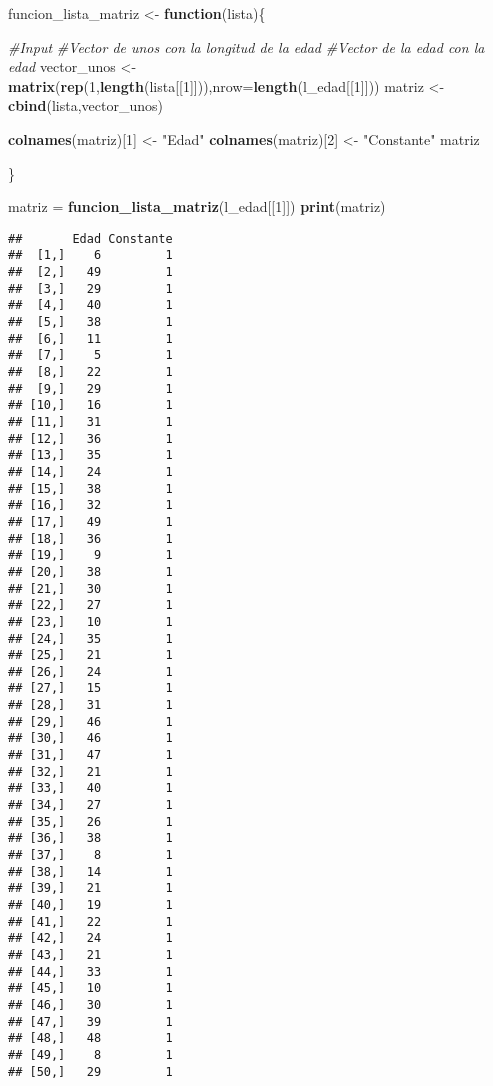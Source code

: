 \documentclass[
]{article}
\newenvironment{Shaded}{\begin{snugshade}}{\end{snugshade}}
\newcommand{\AttributeTok}[1]{\textcolor[rgb]{0.13,0.29,0.53}{#1}}
\newcommand{\CommentTok}[1]{\textcolor[rgb]{0.56,0.35,0.01}{\textit{#1}}}
\newcommand{\ControlFlowTok}[1]{\textcolor[rgb]{0.13,0.29,0.53}{\textbf{#1}}}
\newcommand{\DecValTok}[1]{\textcolor[rgb]{0.00,0.00,0.81}{#1}}
\newcommand{\FunctionTok}[1]{\textcolor[rgb]{0.13,0.29,0.53}{\textbf{#1}}}
\newcommand{\NormalTok}[1]{#1}
\newcommand{\OtherTok}[1]{\textcolor[rgb]{0.56,0.35,0.01}{#1}}
\newcommand{\StringTok}[1]{\textcolor[rgb]{0.31,0.60,0.02}{#1}}
\begin{document}
\begin{Shaded}
\begin{Highlighting}[]
\NormalTok{  funcion\_lista\_matriz }\OtherTok{\textless{}{-}} \ControlFlowTok{function}\NormalTok{(lista)\{}
    
    \CommentTok{\#Input}
      \CommentTok{\#Vector de unos con la longitud de la edad}
      \CommentTok{\#Vector de la edad con la edad    }
\NormalTok{    vector\_unos }\OtherTok{\textless{}{-}} \FunctionTok{matrix}\NormalTok{(}\FunctionTok{rep}\NormalTok{(}\DecValTok{1}\NormalTok{,}\FunctionTok{length}\NormalTok{(lista[[}\DecValTok{1}\NormalTok{]])),}\AttributeTok{nrow=}\FunctionTok{length}\NormalTok{(l\_edad[[}\DecValTok{1}\NormalTok{]]))}
\NormalTok{    matriz }\OtherTok{\textless{}{-}} \FunctionTok{cbind}\NormalTok{(lista,vector\_unos)}
    
    \FunctionTok{colnames}\NormalTok{(matriz)[}\DecValTok{1}\NormalTok{] }\OtherTok{\textless{}{-}} \StringTok{"Edad"}
    \FunctionTok{colnames}\NormalTok{(matriz)[}\DecValTok{2}\NormalTok{] }\OtherTok{\textless{}{-}} \StringTok{"Constante"}
\NormalTok{    matriz}
    
\NormalTok{  \}}

\NormalTok{matriz }\OtherTok{=} \FunctionTok{funcion\_lista\_matriz}\NormalTok{(l\_edad[[}\DecValTok{1}\NormalTok{]])}
\FunctionTok{print}\NormalTok{(matriz)}
\end{Highlighting}
\end{Shaded}

\begin{verbatim}
##       Edad Constante
##  [1,]    6         1
##  [2,]   49         1
##  [3,]   29         1
##  [4,]   40         1
##  [5,]   38         1
##  [6,]   11         1
##  [7,]    5         1
##  [8,]   22         1
##  [9,]   29         1
## [10,]   16         1
## [11,]   31         1
## [12,]   36         1
## [13,]   35         1
## [14,]   24         1
## [15,]   38         1
## [16,]   32         1
## [17,]   49         1
## [18,]   36         1
## [19,]    9         1
## [20,]   38         1
## [21,]   30         1
## [22,]   27         1
## [23,]   10         1
## [24,]   35         1
## [25,]   21         1
## [26,]   24         1
## [27,]   15         1
## [28,]   31         1
## [29,]   46         1
## [30,]   46         1
## [31,]   47         1
## [32,]   21         1
## [33,]   40         1
## [34,]   27         1
## [35,]   26         1
## [36,]   38         1
## [37,]    8         1
## [38,]   14         1
## [39,]   21         1
## [40,]   19         1
## [41,]   22         1
## [42,]   24         1
## [43,]   21         1
## [44,]   33         1
## [45,]   10         1
## [46,]   30         1
## [47,]   39         1
## [48,]   48         1
## [49,]    8         1
## [50,]   29         1
\end{verbatim}
\end{document}
